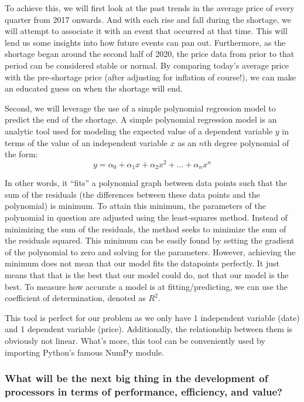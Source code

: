 \documentclass[conference]{IEEEtran}
\begin{document}
To achieve this, we will first look at the past trends in the average price of
every quarter from 2017 onwards. And with each rise and fall during the
shortage, we will attempt to associate it with an event that occurred at that
time. This will lend us some insights into how future events can pan out.
Furthermore, as the shortage began around the second half of 2020, the price
data from prior to that period can be considered stable or normal. By
comparing today's average price with the pre-shortage price (after adjusting for
inflation of course!), we can make an educated guess on when the shortage
will end.

Second, we will leverage the use of a simple polynomial regression model to
predict the end of the shortage.
A simple polynomial regression model is an analytic tool used for modeling the
expected value of a dependent variable $y$ in terms of the value of an
independent variable $x$ as an $n$th degree polynomial of the form:
\[y = \alpha_{0} + \alpha_{1}x + \alpha_{2}x^{2} + ... + \alpha_{n}x^{n}\]

In other words, it ``fits'' a polynomial graph between data points such that the
sum of the residuals (the differences between these data points and the
polynomial) is minimum. To attain this minimum, the parameters of the
polynomial in question are adjusted using the least-squares method. Instead of
minimizing the sum of the residuals, the method seeks to minimize the
sum of the residuals squared. This minimum can be easily found by setting the
gradient of the polynomial to zero and solving for the parameters. However,
achieving the minimum does not mean that our model fits the datapoints
perfectly. It just means that that is the best that our model could do, not
that our model is the best. To measure how accurate a model is at
fitting/predicting, we can use the coefficient of determination,
denoted as $R^{2}$.

This tool is perfect for our problem as we only have 1 independent variable
(date) and 1 dependent variable (price). Additionally, the relationship between
them is obviously not linear. What's more, this tool can be conveniently used
by importing Python's famous NumPy module.

\subsubsection{What will be the next big thing in the development of
	processors in terms of performance, efficiency, and value?}
\end{document}

